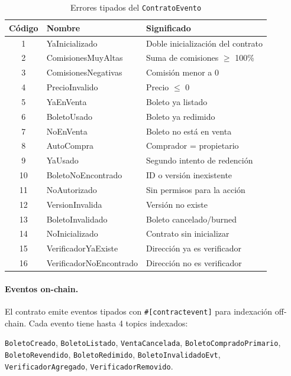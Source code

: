 \documentclass[12pt,oneside]{article}
\begin{document}
\begin{table}[htbp]
  \centering
  \small
  \begin{tabularx}{\textwidth}{@{}c l X@{}}
    \toprule
    \textbf{Código} & \textbf{Nombre} & \textbf{Significado}\\
    \midrule
    1 & YaInicializado & Doble inicialización del contrato\\
    2 & ComisionesMuyAltas & Suma de comisiones $\geq$ 100\%\\
    3 & ComisionesNegativas & Comisión menor a 0\\
    4 & PrecioInvalido & Precio $\leq$ 0\\
    5 & YaEnVenta & Boleto ya listado\\
    6 & BoletoUsado & Boleto ya redimido\\
    7 & NoEnVenta & Boleto no está en venta\\
    8 & AutoCompra & Comprador = propietario\\
    9 & YaUsado & Segundo intento de redención\\
    10 & BoletoNoEncontrado & ID o versión inexistente\\
    11 & NoAutorizado & Sin permisos para la acción\\
    12 & VersionInvalida & Versión no existe\\
    13 & BoletoInvalidado & Boleto cancelado/burned\\
    14 & NoInicializado & Contrato sin inicializar\\
    15 & VerificadorYaExiste & Dirección ya es verificador\\
    16 & VerificadorNoEncontrado & Dirección no es verificador\\
    \bottomrule
  \end{tabularx}
  \caption{Errores tipados del \texttt{ContratoEvento}}
  \label{tab:errores-contrato}
\end{table}

\paragraph{Eventos on-chain.} El contrato emite eventos tipados con \texttt{\#[contractevent]} para indexación off-chain. Cada evento tiene hasta 4 topics indexados:

\texttt{BoletoCreado}, \texttt{BoletoListado}, \texttt{VentaCancelada}, \texttt{BoletoCompradoPrimario}, \texttt{BoletoRevendido}, \texttt{BoletoRedimido}, \texttt{BoletoInvalidadoEvt}, \texttt{VerificadorAgregado}, \texttt{VerificadorRemovido}.
\end{document}

